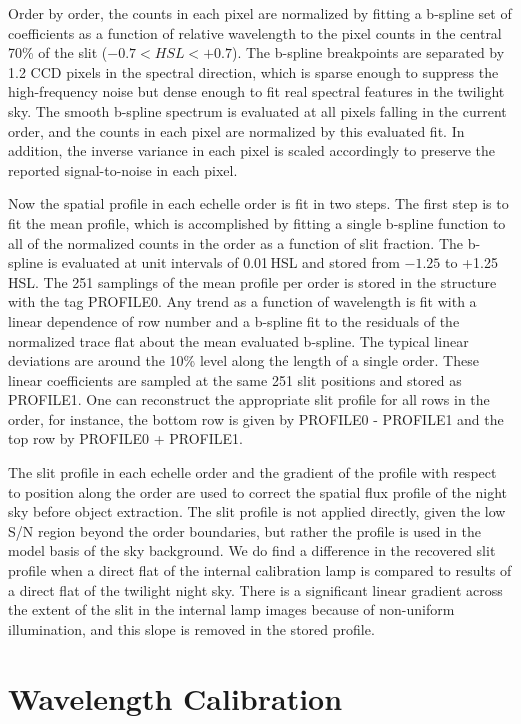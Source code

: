 \documentclass[12pt,preprint]{aastex}
\begin{document}
Order by order, the counts in each pixel are normalized by 
fitting a b-spline set of 
coefficients as a function of relative wavelength to the pixel counts
in the central 70\% of the slit ($-0.7 < HSL < +0.7$).
The b-spline breakpoints are 
separated by 1.2 CCD pixels in the spectral direction, which is sparse enough
to suppress the high-frequency noise but dense enough to fit real 
spectral features in the twilight sky.
The smooth b-spline spectrum is evaluated at all pixels falling in the current
order, and the counts in each pixel are normalized by this evaluated fit.
In addition, the inverse variance in each pixel is scaled accordingly to 
preserve the reported signal-to-noise in each pixel.

Now the spatial profile in each echelle order is fit in two steps.  The first
step is to fit the mean profile, which is accomplished by fitting a single
b-spline function to all of the normalized counts in the order as a function of 
slit fraction.  The b-spline is evaluated at unit intervals of 0.01\,HSL and stored
from $-1.25$ to +1.25\,HSL.  The 251 samplings of the mean profile per order
is stored in the structure with the tag PROFILE0.
Any trend as a function of wavelength is fit with a linear dependence of
row number and a b-spline fit to the residuals of the normalized trace flat
about the mean evaluated b-spline.  The typical linear deviations are 
around the 10\% level along the length of a single order.
These linear coefficients are sampled at the same 251 slit positions and
stored as PROFILE1.  One can reconstruct the appropriate slit profile
for all rows in the order, for instance, the bottom row is given by 
PROFILE0 - PROFILE1 and the top row by PROFILE0 + PROFILE1.

The slit profile in each echelle order 
and the gradient of the profile with respect to position along the order
are used to correct the spatial flux profile of the night sky before 
object extraction.
The slit profile is not applied directly, given the low S/N region beyond 
the order boundaries, but rather the profile is used in the model basis 
of the sky background.  We do find a difference in the recovered slit profile
when a direct flat of the internal calibration lamp is compared
to results of a direct flat of the twilight night sky.  There is a significant
linear gradient across the extent of the slit in the internal lamp images
because of non-uniform illumination, and
this slope is removed in the stored profile.


\section{Wavelength Calibration}
\label{sec:wave}
\end{document}
